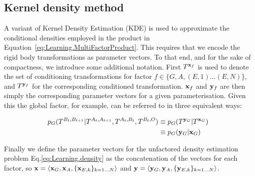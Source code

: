 \subsection{Kernel density method}\label{sec:Implementation.kde}

A variant of Kernel Density Estimation (KDE) \cite{scott2004multi-dimensional} is used to approximate the conditional densities employed in the product in Equation~\eqref{eq:Learning.MultiFactorProduct}. This requires that we encode the rigid body transformations as parameter vectors. To that end, and for the sake of compactness, we introduce some additional notation. First $T^{\mathbf{x}_f}$ is used to denote the set of conditioning transformations for factor $f \in \{G, A, (E,1) \ldots (E,N)\}$, and $T^{\mathbf{y}_f}$ for the corresponding conditioned transformation. $\mathbf{x}_f$ and $\mathbf{y}_f$ are then simply the corresponding parameter vectors for a given parameterisation. Given this the global factor, for example, can be  referred to in three equivalent ways:

\begin{eqnarray*}
p_G(T^{B_{t}, B_{t+1}}|T^{A_{t}, A_{t+1}}, T^{A_t, B_t}, T^{B_t, O}) & \equiv p_G(T^{\mathbf{y}_G}|T^{\mathbf{x}_G})  \\
& \equiv p_G(\mathbf{y}_G|\mathbf{x}_G)
\end{eqnarray*}

Finally we define the parameter vectors for the unfactored density estimation problem Eq.\eqref{eq:Learning.density} as the concatenation of the vectors for each factor, so $\mathbf{x}= \langle \mathbf{x}_G, \mathbf{x}_A, \{\mathbf{x}_{E,k}\}_{k = 1 \ldots N} \rangle$ and $\mathbf{y} = \langle \mathbf{y}_G, \mathbf{y}_A, \{\mathbf{y}_{E,k}\}_{k = 1 \ldots N} \rangle$.

